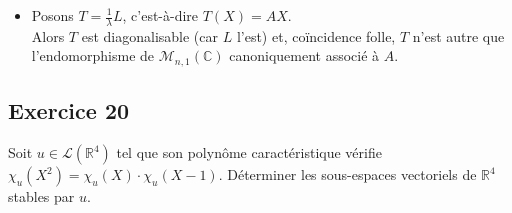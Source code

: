 \documentclass[a4paper,12pt]{article}
\begin{document}
\begin{enumerate}
\begin{correctionbox}
\begin{itemize}
                \item Posons \(T = \frac{1}{\lambda}L\), c'est-à-dire \(T(X) = AX\). \\
                Alors \(T\) est diagonalisable (car \(L\) l'est) et, coïncidence folle, \(T\) n'est autre que l'endomorphisme de \(\mathcal{M}_{n,1}(\mathbb{C})\) canoniquement associé à \(A\).\\
            \end{itemize}
        \end{correctionbox}
    \end{enumerate}



    \subsection*{Exercice 20}
    Soit \( u \in \mathcal{L}(\mathbb{R}^4) \) tel que son polynôme caractéristique vérifie \( \chi_u(X^2) = \chi_u(X) \cdot \chi_u(X - 1) \). Déterminer les sous-espaces vectoriels de \( \mathbb{R}^4 \) stables par \( u \).
    
\end{document}
